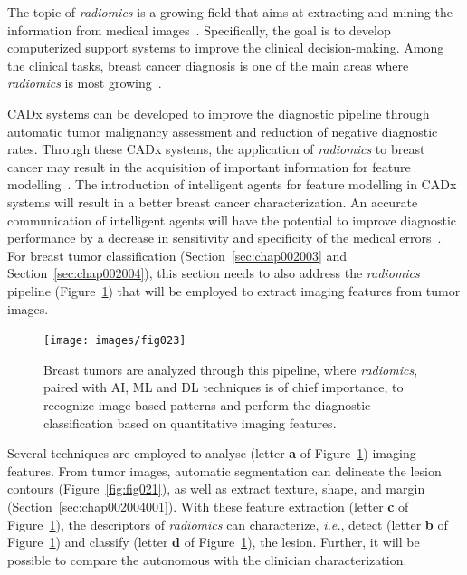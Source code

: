 The topic of {\it radiomics} is a growing field that aims at extracting and mining the information from medical images~\cite{van2020radiomics}.
Specifically, the goal is to develop computerized support systems to improve the clinical decision-making.
Among the clinical tasks, breast cancer diagnosis is one of the main areas where {\it radiomics} is most growing~\cite{valdora2018rapid}.

\ac{CADx} systems can be developed to improve the diagnostic pipeline through automatic tumor malignancy assessment and reduction of negative diagnostic rates.
Through these \ac{CADx} systems, the application of {\it radiomics} to breast cancer may result in the acquisition of important information for feature modelling~\cite{10.1007/978-3-030-59716-0_71}.
The introduction of intelligent agents for feature modelling in \ac{CADx} systems will result in a better breast cancer characterization.
An accurate communication of intelligent agents will have the potential to improve diagnostic performance by a decrease in sensitivity and specificity of the medical errors~\cite{doi:10.1148/radiol.2020192039}.
For breast tumor classification (Section~\ref{sec:chap002003} and Section~\ref{sec:chap002004}), this section needs to also address the {\it radiomics} pipeline (Figure~\ref{fig:fig023}) that will be employed to extract imaging features from tumor images.

\begin{figure}[htbp]
\centering
\texttt{[image: images/fig023]}
\caption{Breast tumors are analyzed through this pipeline, where {\it radiomics}, paired with AI, ML and DL techniques is of chief importance, to recognize image-based patterns and perform the diagnostic classification based on quantitative imaging features.}
\label{fig:fig023}
\end{figure}

Several techniques are employed to analyse (letter {\bf a} of Figure~\ref{fig:fig023}) imaging features.
From tumor images, automatic segmentation can delineate the lesion contours (Figure~\ref{fig:fig021}), as well as extract texture, shape, and margin (Section~\ref{sec:chap002004001}).
With these feature extraction (letter {\bf c} of Figure~\ref{fig:fig023}), the descriptors of {\it radiomics} can characterize, {\it i.e.}, detect (letter {\bf b} of Figure~\ref{fig:fig023}) and classify (letter {\bf d} of Figure~\ref{fig:fig023}), the lesion.
Further, it will be possible to compare the autonomous with the clinician characterization.

